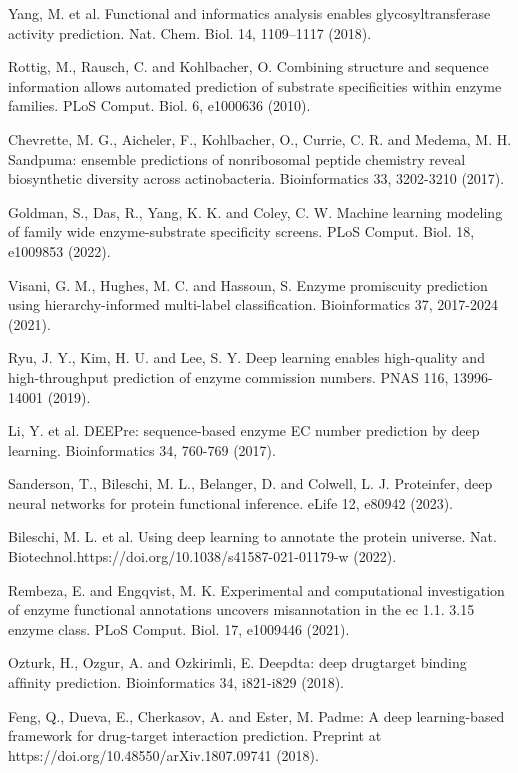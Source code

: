 \documentclass[12pt]{article}
\begin{document}
\begin{thebibliography}{20}
 Yang, M. et al. Functional and informatics analysis enables glycosyltransferase activity prediction. Nat. Chem. Biol. 14, 1109–1117 (2018).

 Rottig, M., Rausch, C. and Kohlbacher, O. Combining structure and sequence information allows automated prediction of substrate speciﬁcities within enzyme families. PLoS Comput. Biol. 6, e1000636 (2010).

 Chevrette, M. G., Aicheler, F., Kohlbacher, O., Currie, C. R. and Medema, M. H. Sandpuma: ensemble predictions of nonribosomal peptide chemistry reveal biosynthetic diversity across actinobacteria. Bioinformatics 33, 3202-3210 (2017).

 Goldman, S., Das, R., Yang, K. K. and Coley, C. W. Machine learning modeling of family wide enzyme-substrate speciﬁcity screens. PLoS Comput. Biol. 18, e1009853 (2022).

 Visani, G. M., Hughes, M. C. and Hassoun, S. Enzyme promiscuity prediction using hierarchy-informed multi-label classiﬁcation. Bioinformatics 37, 2017-2024 (2021).

 Ryu, J. Y., Kim, H. U. and Lee, S. Y. Deep learning enables high-quality and high-throughput prediction of enzyme commission numbers. PNAS 116, 13996-14001 (2019).

 Li, Y. et al. DEEPre: sequence-based enzyme EC number prediction by deep learning. Bioinformatics 34, 760-769 (2017).

 Sanderson, T., Bileschi, M. L., Belanger, D. and Colwell, L. J. Proteinfer, deep neural networks for protein functional inference. eLife 12, e80942 (2023).

 Bileschi, M. L. et al. Using deep learning to annotate the protein universe. Nat. Biotechnol.https://doi.org/10.1038/s41587-021-01179-w (2022).

 Rembeza, E. and Engqvist, M. K. Experimental and computational investigation of enzyme functional annotations uncovers misannotation in the ec 1.1. 3.15 enzyme class. PLoS Comput. Biol. 17, e1009446 (2021).

 Ozturk, H., Ozgur, A. and Ozkirimli, E. Deepdta: deep drugtarget binding afﬁnity prediction. Bioinformatics 34, i821-i829 (2018).

 Feng, Q., Dueva, E., Cherkasov, A. and Ester, M. Padme: A deep learning-based framework for drug-target interaction prediction. Preprint at https://doi.org/10.48550/arXiv.1807.09741 (2018).


\end{thebibliography}
\end{document}
